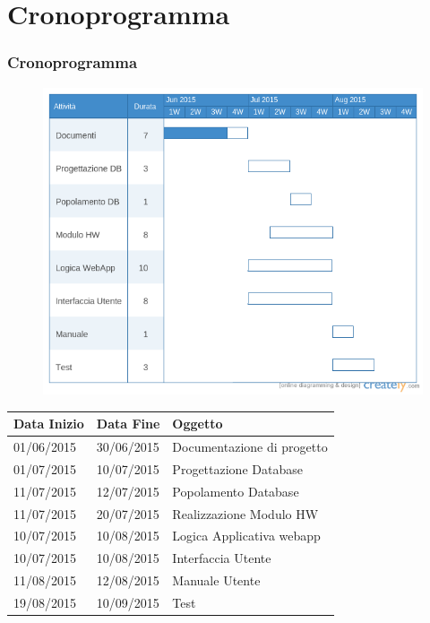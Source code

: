 \documentclass[a4paper,12pt]{beamer}
\begin{document}
\section{Cronoprogramma}
\begin{frame}
\frametitle{Cronoprogramma}
\begin{figure}[htbp]
\centering
\includegraphics[trim={0 0.66cm 0 0}, clip, scale=0.5]{../ProjectPlan/gantt.png}
\end{figure}
\end{frame}

\begin{frame}
\begin{table}[ht]
\begin{center}
\begin{tabular}{l | l | l}
\rowcolor{Ash}
\hline
Data Inizio        & Data Fine	      &  	Oggetto	     \\ \hline
01/06/2015 & 30/06/2015 & Documentazione di progetto  \\ \hline
01/07/2015 & 10/07/2015 & Progettazione Database	     \\ \hline
11/07/2015 & 12/07/2015 & Popolamento Database	     \\ \hline
11/07/2015 & 20/07/2015 & Realizzazione Modulo HW    \\ \hline
10/07/2015 & 10/08/2015 & Logica Applicativa webapp    \\ \hline
10/07/2015 & 10/08/2015 & Interfaccia Utente			     \\ \hline
11/08/2015 & 12/08/2015 & Manuale Utente			     \\ \hline
19/08/2015 & 10/09/2015 & Test						     \\ \hline
\end{tabular}
\end{center}
\end{table}
\end{frame}
\end{document}
